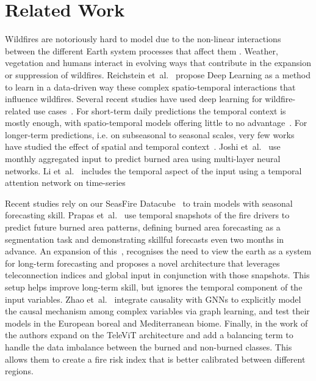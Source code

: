 \section{Related Work}
Wildfires are notoriously hard to model due to the non-linear interactions between the different Earth system processes
that affect them \cite{hantson2016status}. Weather, vegetation and humans interact in evolving ways that contribute in the
expansion or suppression of wildfires. Reichstein et~al.~\cite{reichstein2019deep} propose Deep Learning as a method to learn
in a  data-driven way these complex spatio-temporal interactions that influence wildfires. Several recent studies have used deep
learning for wildfire-related use cases~\cite{jain_review_2020}. For short-term daily predictions the temporal context is mostly
enough, with spatio-temporal models offering little to no advantage~\cite{prapas2021deep, kondylatos2022wildfire}. For longer-term
predictions, i.e. on subseasonal to seasonal scales, very few works have studied the effect of spatial and temporal
context~\cite{joshi2021improving, prapas2022deep, Prapas_2023_ICCV}.
Joshi et~al.~\cite{joshi2021improving} use monthly aggregated input to predict burned area using multi-layer neural networks.
Li et~al.~\cite{li2023attentionfire_v1} includes the temporal aspect of the input using a temporal attention network on time-series

Recent studies rely on our SeasFire Datacube~\cite{karasante2023seasfire} to train models with seasonal forecasting skill.
Prapas et~al.~\cite{prapas2022deep} use temporal snapshots of the fire drivers to predict future burned area patterns,
defining burned area forecasting as a segmentation task and demonstrating skillful forecasts even two months in advance. An
expansion of this~\cite{Prapas_2023_ICCV}, recognises the need to view the earth as a system for long-term forecasting and proposes a novel architecture that leverages teleconnection indices and global input in conjunction with those snapshots. This setup helps improve long-term skill, but ignores the temporal component of the input variables. 
Zhao et~al.~\cite{zhao2024causal} integrate causality with GNNs to explicitly model the causal mechanism among complex
variables via graph learning, and test their models in the European boreal and Mediterranean biome.
Finally, in the work of \cite{zhu2025unveiling} the authors expand on the TeleViT architecture and add a balancing term to handle the data imbalance between the burned and non-burned classes. This allows them to create a fire risk index that is better calibrated between different regions. 

